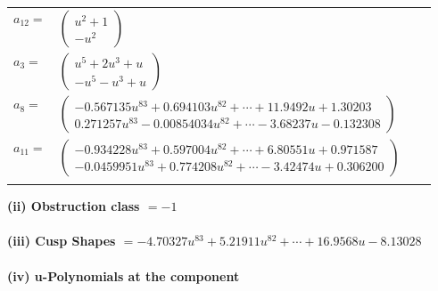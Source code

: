 \documentclass[1p]{elsarticle_modified}
\theoremstyle{definition}
\begin{document}
\begin{tabular}{m{7pt} m{180pt} m{7pt} m{180pt} }
\flushright $a_{12}=$&$\begin{pmatrix}u^2+1\\- u^2\end{pmatrix}$ \\
\flushright $a_{3}=$&$\begin{pmatrix}u^5+2 u^3+u\\- u^5- u^3+u\end{pmatrix}$ \\
\flushright $a_{8}=$&$\begin{pmatrix}-0.567135 u^{83}+0.694103 u^{82}+\cdots+11.9492 u+1.30203\\0.271257 u^{83}-0.00854034 u^{82}+\cdots-3.68237 u-0.132308\end{pmatrix}$ \\
\flushright $a_{11}=$&$\begin{pmatrix}-0.934228 u^{83}+0.597004 u^{82}+\cdots+6.80551 u+0.971587\\-0.0459951 u^{83}+0.774208 u^{82}+\cdots-3.42474 u+0.306200\end{pmatrix}$\\&\end{tabular}
\flushleft \textbf{(ii) Obstruction class $= -1$}\\~\\
\flushleft \textbf{(iii) Cusp Shapes $= -4.70327 u^{83}+5.21911 u^{82}+\cdots+16.9568 u-8.13028$}\\~\\
\newpage\renewcommand{\arraystretch}{1}
\flushleft \textbf{(iv) u-Polynomials at the component}\newline \\
\end{document}
